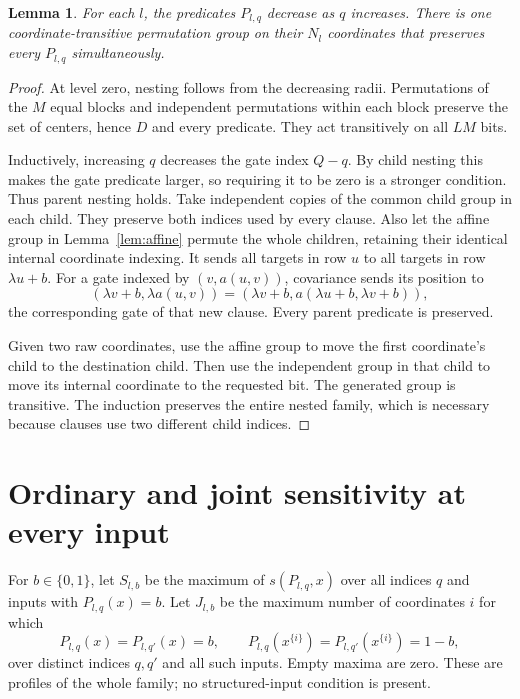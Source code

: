 \documentclass[11pt]{article}
\newtheorem{lemma}[theorem]{Lemma}
\theoremstyle{definition}
\newcommand{\bits}{\{0,1\}}
\begin{document}
\begin{lemma}\label{lem:nested}
For each $l$, the predicates $P_{l,q}$ decrease as $q$ increases. There is one coordinate-transitive permutation group on their $N_l$ coordinates that preserves every $P_{l,q}$ simultaneously.
\end{lemma}
\begin{proof}
At level zero, nesting follows from the decreasing radii. Permutations of the $M$ equal blocks and independent permutations within each block preserve the set of centers, hence $D$ and every predicate. They act transitively on all $LM$ bits.

Inductively, increasing $q$ decreases the gate index $Q-q$. By child nesting this makes the gate predicate larger, so requiring it to be zero is a stronger condition. Thus parent nesting holds. Take independent copies of the common child group in each child. They preserve both indices used by every clause. Also let the affine group in Lemma~\ref{lem:affine} permute the whole children, retaining their identical internal coordinate indexing. It sends all targets in row $u$ to all targets in row $\lambda u+b$. For a gate indexed by $(v,a(u,v))$, covariance sends its position to
\[
 (\lambda v+b,\lambda a(u,v))
 =(\lambda v+b,a(\lambda u+b,\lambda v+b)),
\]
the corresponding gate of that new clause. Every parent predicate is preserved.

Given two raw coordinates, use the affine group to move the first coordinate's child to the destination child. Then use the independent group in that child to move its internal coordinate to the requested bit. The generated group is transitive. The induction preserves the entire nested family, which is necessary because clauses use two different child indices.
\end{proof}

\section{Ordinary and joint sensitivity at every input}\label{sec:recurrences}
For $b\in\bits$, let $S_{l,b}$ be the maximum of $s(P_{l,q},x)$ over all indices $q$ and inputs with $P_{l,q}(x)=b$. Let $J_{l,b}$ be the maximum number of coordinates $i$ for which
\[
 P_{l,q}(x)=P_{l,q'}(x)=b,\qquad
 P_{l,q}(x^{\{i\}})=P_{l,q'}(x^{\{i\}})=1-b,
\]
over distinct indices $q,q'$ and all such inputs. Empty maxima are zero. These are profiles of the whole family; no structured-input condition is present.
\end{document}
